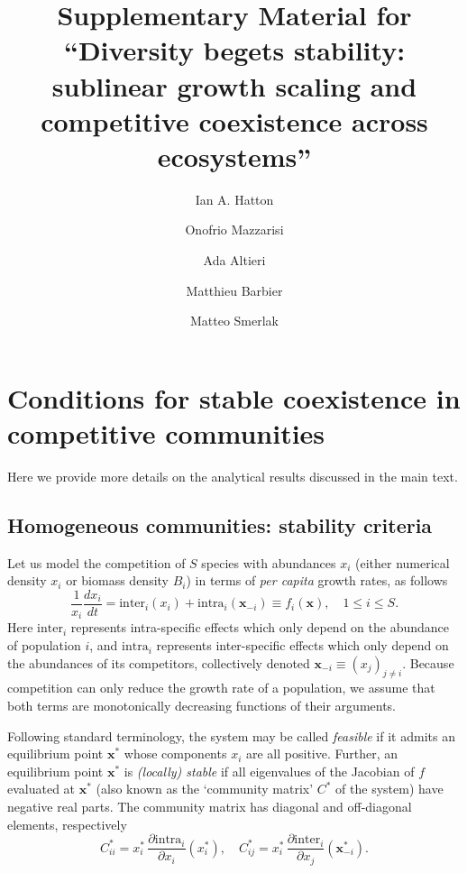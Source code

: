 \documentclass[12pt]{article}
\title{Supplementary Material for\\\vspace{1cm} ``Diversity begets stability: sublinear growth scaling and competitive coexistence across ecosystems''}
\author{Ian A. Hatton \and Onofrio Mazzarisi \and Ada Altieri \and Matthieu Barbier \and Matteo Smerlak}
\newcommand{\inter}{\textrm{inter}}
\newcommand{\intra}{\textrm{intra}}
\begin{document}
\appendix

\maketitle

\section{Conditions for stable coexistence in competitive communities}

Here we provide more details on the analytical results discussed in the main text. 

\subsection{Homogeneous communities: stability criteria}\label{homogeneous-stability}

Let us model the competition of $S$ species with abundances $x_i$ (either numerical density $x_i$ or biomass density $B_i$) in terms of \emph{per capita} growth rates, as follows
\begin{equation}\label{model}
\frac{1}{x_i}\frac{dx_i}{dt} = \inter_i(x_i) + \intra_i(\mathbf x_{-i})\equiv f_i(\mathbf x), \quad 1\leq i\leq S .
\end{equation}
Here $\inter_i$ represents intra-specific effects which only depend on the abundance of population $i$, and  $\intra_i$ represents inter-specific effects which only depend on the abundances of its competitors, collectively denoted $\mathbf x_{-i}\equiv (x_j)_{j \neq i}$. Because competition can only reduce the growth rate of a population, we assume that both terms are monotonically decreasing functions of their arguments. 

Following standard terminology, the system may be called \emph{feasible} if it admits an equilibrium point $\mathbf x^*$ whose components $x_i$ are all positive. Further, an equilibrium point $\mathbf x^*$ is \emph{(locally) stable} if all eigenvalues of the Jacobian of $f$ evaluated at $\mathbf x^*$ (also known as the `community matrix' $C^*$ of the system) have negative real parts. 
The community matrix has diagonal and off-diagonal elements, respectively 
\begin{equation}\label{community-matrix}
    C^*_{ii} = x_i^*\, \frac{\partial \intra_i}{\partial x_i}(x_i^*), \quad C^*_{ij} = x_i^*\, \frac{\partial \inter_i}{\partial x_j}(\mathbf x_{-i}^*).
\end{equation}
\end{document}
